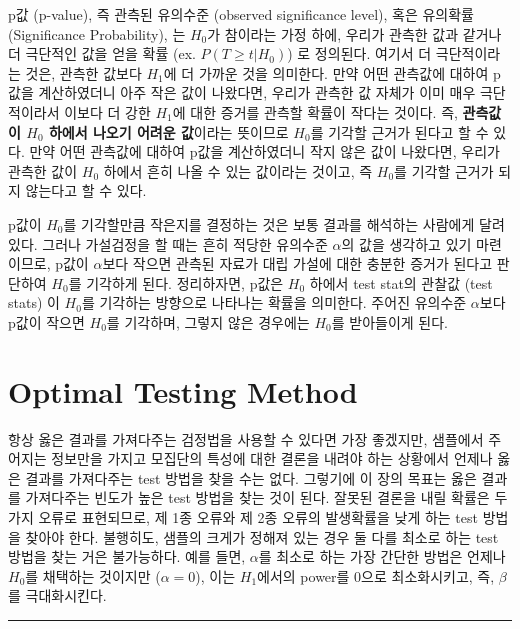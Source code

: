 \documentclass[
]{book}
\begin{document}
p값 (p-value), 즉 관측된 유의수준 (observed significance level), 혹은 유의확률 (Significance Probability), 는 \(H_0\)가 참이라는 가정 하에, 우리가 관측한 값과 같거나 더 극단적인 값을 얻을 확률 (ex. \(P(T \ge t \vert H_0 )\)) 로 정의된다. 여기서 더 극단적이라는 것은, 관측한 값보다 \(H_1\)에 더 가까운 것을 의미한다. 만약 어떤 관측값에 대하여 p값을 계산하였더니 아주 작은 값이 나왔다면, 우리가 관측한 값 자체가 이미 매우 극단적이라서 이보다 더 강한 \(H_1\)에 대한 증거를 관측할 확률이 작다는 것이다. 즉, \textbf{관측값이 \(H_0\) 하에서 나오기 어려운 값}이라는 뜻이므로 \(H_0\)를 기각할 근거가 된다고 할 수 있다. 만약 어떤 관측값에 대하여 p값을 계산하였더니 작지 않은 값이 나왔다면, 우리가 관측한 값이 \(H_0\) 하에서 흔히 나올 수 있는 값이라는 것이고, 즉 \(H_0\)를 기각할 근거가 되지 않는다고 할 수 있다.

p값이 \(H_0\)를 기각할만큼 작은지를 결정하는 것은 보통 결과를 해석하는 사람에게 달려있다. 그러나 가설검정을 할 때는 흔히 적당한 유의수준 \(\alpha\)의 값을 생각하고 있기 마련이므로, p값이 \(\alpha\)보다 작으면 관측된 자료가 대립 가설에 대한 충분한 증거가 된다고 판단하여 \(H_0\)를 기각하게 된다. 정리하자면, p값은 \(H_0\) 하에서 test stat의 관찰값 (test stats) 이 \(H_0\)를 기각하는 방향으로 나타나는 확률을 의미한다. 주어진 유의수준 \(\alpha\)보다 p값이 작으면 \(H_0\)를 기각하며, 그렇지 않은 경우에는 \(H_0\)를 받아들이게 된다.

\hypertarget{optimal-testing-method}{%
\section{Optimal Testing Method}\label{optimal-testing-method}}

항상 옳은 결과를 가져다주는 검정법을 사용할 수 있다면 가장 좋겠지만, 샘플에서 주어지는 정보만을 가지고 모집단의 특성에 대한 결론을 내려야 하는 상황에서 언제나 옳은 결과를 가져다주는 test 방법을 찾을 수는 없다. 그렇기에 이 장의 목표는 옳은 결과를 가져다주는 빈도가 높은 test 방법을 찾는 것이 된다. 잘못된 결론을 내릴 확률은 두 가지 오류로 표현되므로, 제 1종 오류와 제 2종 오류의 발생확률을 낮게 하는 test 방법을 찾아야 한다. 불행히도, 샘플의 크게가 정해져 있는 경우 둘 다를 최소로 하는 test 방법을 찾는 거은 불가능하다. 예를 들면, \(\alpha\)를 최소로 하는 가장 간단한 방법은 언제나 \(H_0\)를 채택하는 것이지만 (\(\alpha = 0\)), 이는 \(H_1\)에서의 power를 0으로 최소화시키고, 즉, \(\beta\)를 극대화시킨다.

\begin{center}\rule{0.5\linewidth}{0.5pt}\end{center}
\end{document}
